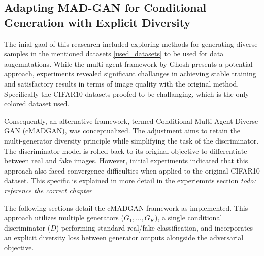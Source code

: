 \newcommand{\definegenerator}{\texttt{define\_generator}}
\newcommand{\definediscriminator}{\texttt{define\_discriminator}}
\newcommand{\lambdadiv}{\lambda_{\text{div}}}
\subsection[Adapting MAD-GAN for Conditional Generation with Explicit Diversity - CMADGAN]{Adapting MAD-GAN for Conditional Generation with Explicit Diversity}
\label{theoretical_cmadgan}

The inial gaol of this reasearch included exploring methods for generating diverse samples in the mentioned datasets \ref{used_datasets} to be used for data augemntations. While the multi-agent framework by Ghosh presents a potential approach, experiments revealed significant challanges in achieving stable training and satisfactory results in terms of image quality with the original method. Specifically the CIFAR10 datasets proofed to be challanging, which is the only colored dataset used.

Consequently, an alternative framework, termed Conditional Multi-Agent Diverse GAN (cMADGAN), was conceptualized. The adjustment aims to retain the multi-generator diversity principle while simplifying the task of the discriminator. The discriminator model is rolled back to its original objective to differentiate between real and fake images. However, initial experiments indicated that this approach also faced convergence difficulties when applied to the original CIFAR10 dataset. This specific is explained in more detail in the experiemnts section \textit{todo: reference the correct chapter}


The following sections detail the cMADGAN framework as implemented. This approach utilizes multiple generators (\( G_1, \dots, G_K \)), a single conditional discriminator (\( D \)) performing standard real/fake classification, and incorporates an explicit diversity loss between generator outputs alongside the adversarial objective.

